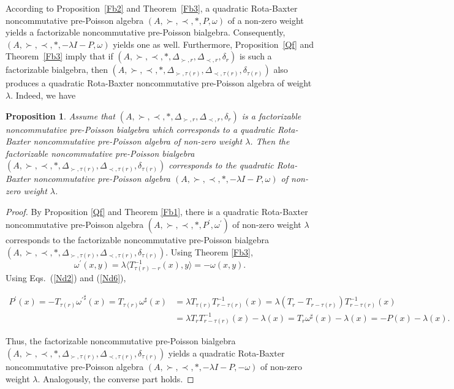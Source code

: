 \documentclass[12pt]{amsart}
\newtheorem{pro}[thm]{Proposition}
\theoremstyle{definition}
\begin{document}
 According to Proposition~\ref{Fb2} and Theorem~\ref{Fb3}, a quadratic Rota-Baxter noncommutative 
 pre-Poisson algebra $(A, \succ, \prec, \ast, P, \omega)$ of a non-zero 
 weight yields a factorizable noncommutative pre-Poisson bialgebra. Consequently, 
 $(A, \succ, \prec, \ast, -\lambda I - P, \omega)$ yields one as well. Furthermore, 
 Proposition~\ref{Qf} and Theorem~\ref{Fb3} imply that if 
 $(A, \succ, \prec, \ast, \Delta_{\succ, r}, \Delta_{\prec, r}, \delta_{r})$ is such a 
 factorizable bialgebra, then $(A, \succ, \prec, \ast, \Delta_{\succ, \tau(r)}, \Delta_{\prec, \tau(r)}, \delta_{\tau(r)})$ 
 also produces a quadratic Rota-Baxter noncommutative pre-Poisson algebra of weight $\lambda$. Indeed, we have

\begin{pro} Assume that $(A, \succ,\prec, \ast, \Delta_{\succ,r}, \Delta_{\prec,r},\delta_{r})$ is a factorizable 
noncommutative pre-Poisson bialgebra which corresponds to a quadratic Rota-Baxter noncommutative 
pre-Poisson algebra of non-zero weight $\lambda$. 
Then the factorizable 
noncommutative pre-Poisson bialgebra $(A,\succ,\prec, \ast, \Delta_{\succ,\tau(r)},\Delta_{\prec,\tau(r)},\delta_{\tau(r)})$ corresponds to the 
quadratic Rota-Baxter noncommutative pre-Poisson algebra $(A,\succ,\prec, \ast,-\lambda I-P,\omega)$ of non-zero weight $\lambda$. 
	
\end{pro}

\begin{proof} By
 Proposition \ref{Qf} and Theorem \ref{Fb1}, there is  a
quadratic Rota-Baxter noncommutative pre-Poisson algebra $(A,\succ,\prec, \ast,P^\prime,\omega^\prime)$ 
of non-zero weight $\lambda$
 corresponds to the factorizable noncommutative pre-Poisson bialgebra
  $(A, \succ,\prec, \ast, \Delta_{\succ,\tau(r)},\Delta_{\prec,\tau(r)},\delta_{\tau(r)})$.
Using Theorem \ref{Fb3},
\begin{equation*} 
\omega^{\prime}(x,y)=\lambda\langle T_{\tau(r)-r}^{-1}(x),y \rangle=-\omega(x,y).\end{equation*}
Using Eqs.~(\ref{Nd2}) and (\ref{Nd6}), 
\begin{small}
\begin{align*} 
P^{\prime}(x)=- T_{\tau(r)}{\omega^{\prime}}^{\sharp}(x)=T_{\tau(r)}\omega^{\sharp}(x)
&=\lambda T_{\tau(r)}T_{r-\tau(r)}^{-1}(x)=\lambda (T_{r}-T_{r-\tau(r)})T_{r-\tau(r)}^{-1}(x)
\\&=\lambda T_{r}T_{r-\tau(r)}^{-1}(x)-\lambda (x)
=T_{r}\omega^{\sharp}(x)-\lambda (x)=-P(x)-\lambda (x)
.\end{align*}\end{small}
Thus, the factorizable 
noncommutative pre-Poisson bialgebra $(A, \succ,\prec,\ast, \Delta_{\succ,\tau(r)},\Delta_{\prec,\tau(r)},\delta_{\tau(r)})$ yields a
quadratic Rota-Baxter noncommutative pre-Poisson algebra $(A,\succ,\prec, \ast,-\lambda I-P,-\omega)$ of non-zero weight $\lambda$.
Analogously, the converse part holds.
\end{proof} 
\end{document}
